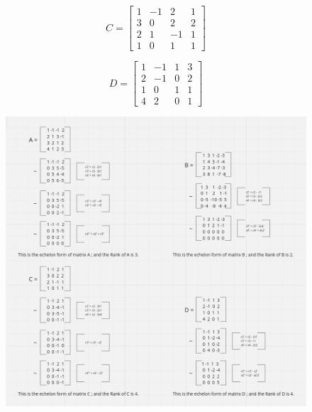 \documentclass{article}
\begin{document}
    \begin{center}
    \begin{minipage}{0.45\textwidth}
    \[ C = \begin{bmatrix} 1 & -1 & 2 & 1 \\ 3 & 0 & 2 & 2 \\ 2 & 1 & -1 & 1 \\ 1 & 0 & 1 & 1 \end{bmatrix} \]
    \end{minipage}
    \hspace{0.05\textwidth}
    \begin{minipage}{0.45\textwidth}
    \[ D = \begin{bmatrix} 1 & -1 & 1 & 3 \\ 2 & -1 & 0 & 2 \\ 1 & 0 & 1 & 1 \\ 4 & 2 & 0 & 1 \end{bmatrix} \]
    \end{minipage}
    \end{center}

    \vspace{120pt}

    \begin{figure}[htbp]
        \centering
        \includegraphics[width=1.2\textwidth, height=.95\textheight]{../Asset/rankOfExc.png}
        \label{fig:example}
    \end{figure}
    
\end{document}
